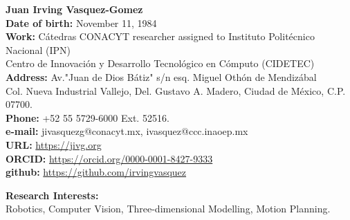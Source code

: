 \documentclass[10pt]{article}
\begin{document}
\begin{center}
{\bf {\Large Juan Irving Vasquez-Gomez}}
\vspace{0.5cm}
\\
\textbf{Date of birth:} November 11, 1984 \\
\textbf{Work:} Cátedras CONACYT researcher assigned to Instituto Politécnico Nacional (IPN)\\
Centro de Innovación y Desarrollo Tecnológico en Cómputo (CIDETEC) \\ 
\textbf{Address:} Av."Juan de Dios Bátiz" s/n esq. Miguel Othón de Mendizábal \\
 Col. Nueva Industrial Vallejo, Del. Gustavo A. Madero, Ciudad de México, C.P. 07700. \\
\textbf{Phone:} +52 55 5729-6000 Ext. 52516. \\
\textbf{e-mail:} jivasquezg@conacyt.mx, ivasquez@ccc.inaoep.mx\\
\textbf{URL:} \url{https://jivg.org} \\
\textbf{ORCID:} \url{https://orcid.org/0000-0001-8427-9333} \\
\textbf{github:} \url{https://github.com/irvingvasquez}

\end{center}

\begin{center}
{\bf Research Interests:} \\ Robotics, Computer Vision, Three-dimensional
Modelling, Motion Planning.
\end{center}
\end{document}
